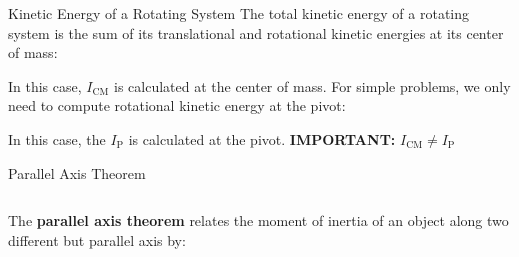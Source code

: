 \documentclass[12pt,compress,aspectratio=169]{beamer}
\begin{document}
\begin{frame}{Kinetic Energy of a Rotating System}
  The total kinetic energy of a rotating system is the sum of its translational
  and rotational kinetic energies at its center of mass:

  
  In this case, $I_\text{CM}$ is calculated at the center of
  mass. For simple problems, we only need to compute rotational kinetic energy
  at the pivot:

  
  In this case, the $I_\text{P}$ is calculated at the pivot.
  \textbf{IMPORTANT:} $I_\text{CM}\neq I_\text{P}$
\end{frame}



\begin{frame}{Parallel Axis Theorem}
  \begin{columns}
    
    The \textbf{parallel axis theorem} relates the moment of inertia of an
    object along two different but parallel axis by:

  \end{columns}
\end{frame}
\end{document}
